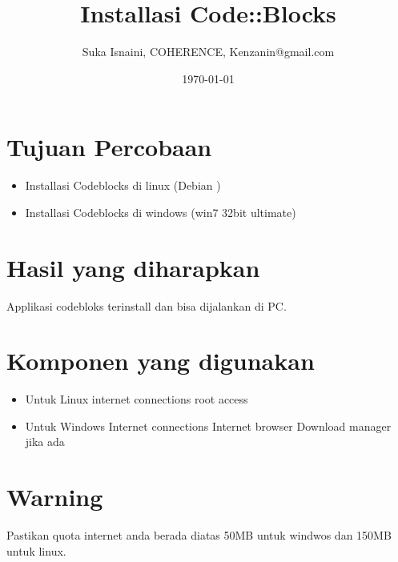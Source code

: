 \def \TITLE     {Installasi Code::Blocks}
\def \AUTHOR    {Suka Isnaini, COHERENCE, Kenzanin@gmail.com}
\def \SUBJECT   {ESP8266}
\def \KEYWORDS  {Python, Python-PIP, PlatformIO}





\title{\TITLE}

\author{\AUTHOR}

\date{\today}

\maketitle
\tableofcontents
\newpage

\section{Tujuan Percobaan}
\begin{itemize}
\item Installasi Codeblocks di linux (Debian )
\item Installasi Codeblocks di windows (win7 32bit ultimate)
\end{itemize}

\section{Hasil yang diharapkan}
Applikasi codebloks terinstall dan bisa dijalankan di PC.

\section{Komponen yang digunakan}
\begin{itemize}
\item Untuk Linux 
\subitem internet connections
\subitem root access
\item Untuk Windows
\subitem Internet connections
\subitem Internet browser
\subitem Download manager jika ada
\end{itemize}

\section{Warning}
Pastikan quota internet anda berada diatas 50MB untuk windwos dan 150MB untuk linux.

